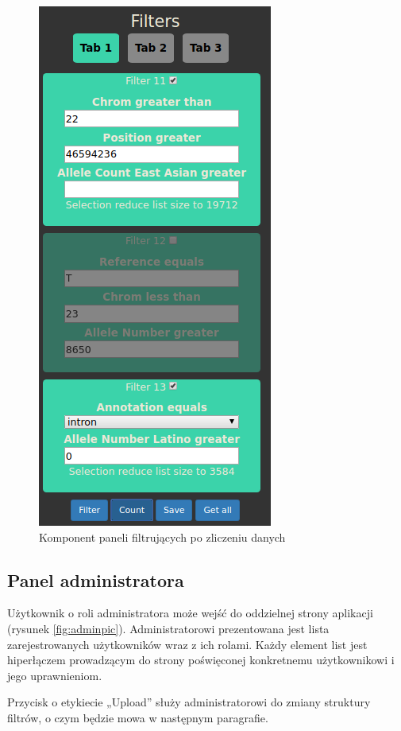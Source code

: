\documentclass[a4paper,12pt,twoside]{article}
\begin{document}
\begin{figure}[H]
\centering
\includegraphics[height=0.95\textheight]{obrazy/aplikacja/count.png}
\caption{Komponent paneli filtrujących po zliczeniu danych}
\label{fig:countpic}
\end{figure}

\subsection{Panel administratora}
Użytkownik o roli administratora może wejść do oddzielnej strony aplikacji (rysunek \ref{fig:adminpic}). Administratorowi prezentowana jest lista zarejestrowanych użytkowników wraz z ich rolami. Każdy element list jest hiperłączem prowadzącym
do strony poświęconej konkretnemu użytkownikowi i jego uprawnieniom.

Przycisk o etykiecie „Upload” służy administratorowi do zmiany struktury
filtrów, o czym będzie mowa w następnym paragrafie.
\end{document}
